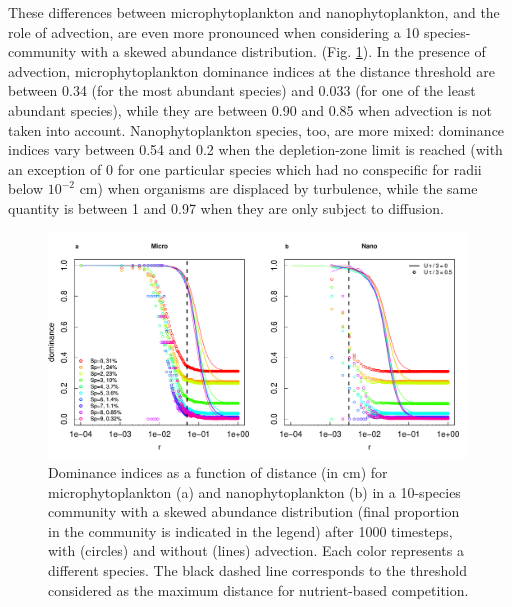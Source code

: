 \documentclass[english]{article}
\begin{document}
These differences between microphytoplankton and nanophytoplankton,
and the role of advection, are even more pronounced when considering
a 10 species-community with a skewed abundance distribution. (Fig.
\ref{fig:Dominance-10sp}). In the presence of advection, microphytoplankton
dominance indices at the distance threshold are between 0.34 (for
the most abundant species) and 0.033 (for one of the least abundant
species), while they are between 0.90 and 0.85 when advection is not
taken into account. Nanophytoplankton species, too, are more mixed:
dominance indices vary between 0.54 and 0.2 when the depletion-zone
limit is reached (with an exception of 0 for one particular species
which had no conspecific for radii below $10^{-2}$ cm) when organisms
are displaced by turbulence, while the same quantity is between 1
and 0.97 when they are only subject to diffusion.

\begin{figure}[H]
\begin{centering}
\includegraphics[width=0.99\textwidth]{../code/figure/dominance_diatom_nano_compare_advection_10sp}
\par\end{centering}
\caption{Dominance indices as a function of distance (in cm) for microphytoplankton
(a) and nanophytoplankton (b) in a 10-species community with a skewed
abundance distribution (final proportion in the community is indicated
in the legend) after 1000 timesteps, with (circles) and without (lines)
advection. Each color represents a different species. The black dashed
line corresponds to the threshold considered as the maximum distance
for nutrient-based competition.\label{fig:Dominance-10sp}}
\end{figure}
\end{document}
